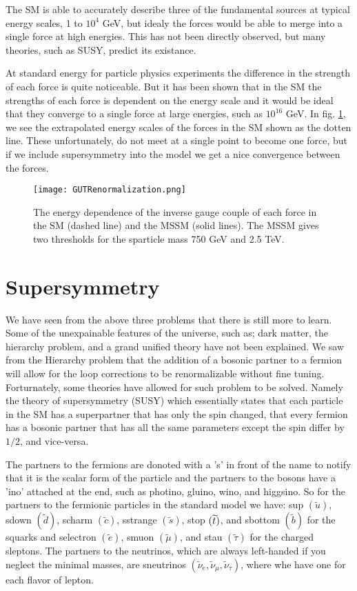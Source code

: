 The SM is able to accurately describe three of the fundamental sources at typical energy scales, 1 to $10^{4}$ GeV, but idealy the forces would be able to merge into a single force at high energies. This has not been directly observed, but many theories, such as SUSY, predict its existance.%

At standard energy for particle physics experiments the difference in the strength of each force is quite noticeable. But it has been shown that in the SM the strengths of each force is dependent on the energy scale and it would be ideal that they converge to a single force at large energies, such as $10^{16}$ GeV. In fig. \ref{GUT}, we see the extrapolated energy scales of the forces in the SM shown as the dotten line. These unfortunately, do not meet at a single point to become one force, but if we include supersymmetry into the model we get a nice convergence between the forces.

\begin{figure}
 	\centering
	\texttt{[image: GUTRenormalization.png]}
 	\caption{The energy dependence of the inverse gauge couple of each force in the SM (dashed line) and the MSSM (solid lines). The MSSM gives two thresholds for the sparticle mass 750 GeV and 2.5 TeV.}
 	\label{GUT} 
\end{figure}

\section{Supersymmetry}

We have seen from the above three problems that there is still more to learn. Some of the unexpainable features of the universe, such as; dark matter, the hierarchy problem, and a grand unified theory have not been explained. We saw from the Hierarchy problem that the addition of a bosonic partner to a fermion will allow for the loop corrections to be renormalizable without fine tuning. Forturnately, some theories have allowed for such problem to be solved. Namely the theory of supersymmetry (SUSY) which essentially states that each particle in the SM has a superpartner that has only the spin changed, that every fermion has a bosonic partner that has all the same parameters except the spin differ by $1/2$, and vice-versa.

The partners to the fermions are donoted with a 's' in front of the name to notify that it is the scalar form of the particle and the partners to the bosons have a 'ino' attached at the end, such as photino, gluino, wino, and higgsino. So for the partners to the fermionic particles in the standard model we have: sup $(\widetilde{u})$, sdown $(\widetilde{d})$, scharm $(\widetilde{c})$, sstrange $(\widetilde{s})$, stop $(\widetilde{t})$, and sbottom $(\widetilde{b})$ for the squarks and selectron $(\widetilde{e})$, smuon $(\widetilde{\mu})$, and stau $(\widetilde{\tau})$ for the charged sleptons. The partners to the neutrinos, which are always left-handed if you neglect the minimal masses, are sneutrinos $(\widetilde{\nu}_e, \widetilde{\nu}_\mu, \widetilde{\nu}_\tau)$, where whe have one for each flavor of lepton. 

